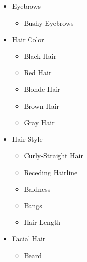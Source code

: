 \begin{itemize}

    \item Eyebrows
    \begin{itemize}
         \item Bushy Eyebrows               \hspace*{\fill Binary}
    \end{itemize}



    \item Hair Color
    \begin{itemize}
    	 \item Black Hair                   \hspace*{\fill Binary}
    	 \item Red Hair                     \hspace*{\fill Binary}
    	 \item Blonde Hair                  \hspace*{\fill Binary}
    	 \item Brown Hair                   \hspace*{\fill Binary}
    	 \item Gray Hair                    \hspace*{\fill Binary}
    \end{itemize}


    \item Hair Style
    \begin{itemize}
    	 \item Curly-Straight Hair          \hspace*{\fill Continuous}
    	 \item Receding Hairline            \hspace*{\fill Binary}
    	 \item Baldness                     \hspace*{\fill Binary}
    	 \item Bangs                        \hspace*{\fill Binary}
    	 \item Hair Length                  \hspace*{\fill Continuous}
    \end{itemize}


    \item Facial Hair
    \begin{itemize}
    	 \item Beard                        \hspace*{\fill Continuous}
    \end{itemize}



\end{itemize}

